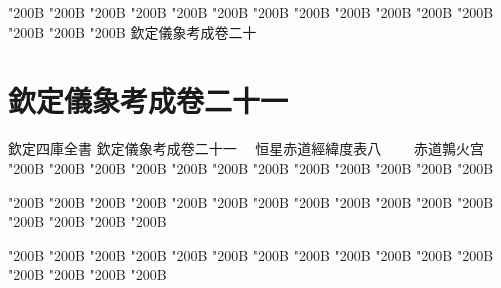 \begin{正文}
\char"200B\relax{}
\char"200B\relax{}
\char"200B\relax{}
\char"200B\relax{}
\char"200B\relax{}
\char"200B\relax{}
\char"200B\relax{}
\char"200B\relax{}
\char"200B\relax{}
\char"200B\relax{}
\char"200B\relax{}
\char"200B\relax{}
\char"200B\relax{}
\char"200B\relax{}
\char"200B\relax{}
欽定儀象考成卷二十
\par

\par\end{正文}\clearpage
\chapter*{欽定儀象考成卷二十一}
\begin{正文}
欽定四庫全書
欽定儀象考成卷二十一
　恒星赤道經緯度表八
　　赤道鶉火宫
\char"200B\relax{}
\char"200B\relax{}
\char"200B\relax{}
\char"200B\relax{}
\char"200B\relax{}
\char"200B\relax{}
\char"200B\relax{}
\char"200B\relax{}
\char"200B\relax{}
\char"200B\relax{}
\char"200B\relax{}
\char"200B\relax
\par
\end{正文}\clearpage
{}
\begin{正文}
\char"200B\relax{}
\char"200B\relax{}
\char"200B\relax{}
\char"200B\relax{}
\char"200B\relax{}
\char"200B\relax{}
\char"200B\relax{}
\char"200B\relax{}
\char"200B\relax{}
\char"200B\relax{}
\char"200B\relax{}
\char"200B\relax{}
\char"200B\relax{}
\char"200B\relax{}
\char"200B\relax{}
\char"200B\relax
{}\par
\end{正文}\clearpage
{}
\begin{正文}
\char"200B\relax{}
\char"200B\relax{}
\char"200B\relax{}
\char"200B\relax{}
\char"200B\relax{}
\char"200B\relax{}
\char"200B\relax{}
\char"200B\relax{}
\char"200B\relax{}
\char"200B\relax{}
\char"200B\relax{}
\char"200B\relax{}
\char"200B\relax{}
\char"200B\relax{}
\char"200B\relax{}
\char"200B\relax
{}\par
\end{正文}\clearpage
